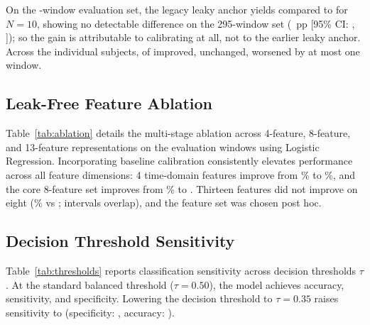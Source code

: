 \documentclass[conference]{IEEEtran}
\begin{document}
On the \valEvalWindows-window evaluation set, the legacy leaky anchor yields \valControlLeakyTwoNineFiveAccPct compared to \valNtenAccPct for $N=10$, showing no detectable difference on the 295-window set (\valPairedGainNtenVsLeaky~pp [95\% CI: \valPairedGainNtenVsLeakyCILow, \valPairedGainNtenVsLeakyCIHigh]); so the gain is attributable to calibrating at all, not to the earlier leaky anchor. Across the \valSubjTotalCount individual subjects, \valSubjImproveCount of \valSubjTotalCount improved, \valSubjUnchangedCount unchanged, \valSubjDecreaseCount worsened by at most one window.

\begin{table}[t]
\centering
\caption{Impact of Baseline Calibration Length on Leak-Free Evaluation ($N_{\text{eval}}=295$ Common Windows, 15 Subjects, $\tau = 0.50$)}
\label{tab:calibration_length}
{\footnotesize
\setlength{\tabcolsep}{2.5pt}

}
\end{table}

\subsection{Leak-Free Feature Ablation}
Table~\ref{tab:ablation} details the multi-stage ablation across 4-feature, 8-feature, and 13-feature representations on the \valEvalWindows evaluation windows using Logistic Regression. Incorporating baseline calibration consistently elevates performance across all feature dimensions: 4 time-domain features improve from \valAblFourRawAcc\% to \valAblFourNtenAcc\%, and the core 8-feature set improves from \valAblEightRawAcc\% to \valNtenAccPct. Thirteen features did not improve on eight (\valAblThirteenNtenAcc\% vs \valNtenAccPct; intervals overlap), and the feature set was chosen post hoc.

\begin{table}[t]
\centering
\caption{Leak-Free Feature Ablation on Common \valEvalWindows\ Windows ($N=10$ Calibration, $\tau = 0.50$)}
\label{tab:ablation}
{\footnotesize
\setlength{\tabcolsep}{4pt}

}
\end{table}

\subsection{Decision Threshold Sensitivity}
Table~\ref{tab:thresholds} reports classification sensitivity across decision thresholds $\tau$. At the standard balanced threshold ($\tau = 0.50$), the model achieves \valNtenAccPct accuracy, \valNtenSensPct sensitivity, and \valNtenSpecPct specificity. Lowering the decision threshold to $\tau = 0.35$ raises sensitivity to \valTauThirtyFiveSensPct (specificity: \valTauThirtyFiveSpecPct, accuracy: \valTauThirtyFiveAccPct).
\end{document}

